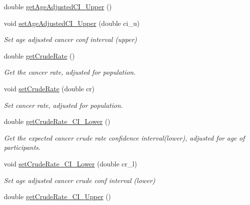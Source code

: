 \begin{DoxyCompactItemize}
double \mbox{\hyperlink{classbridges_1_1data__src__dependent_1_1_cancer_incidence_ae7b71d91c3acae9fce3536f6a9d8362b}{get\+Age\+Adjusted\+C\+I\+\_\+\+Upper}} ()
\item 
void \mbox{\hyperlink{classbridges_1_1data__src__dependent_1_1_cancer_incidence_aeb386486bfbd96ba9ab689b7d95d4522}{set\+Age\+Adjusted\+C\+I\+\_\+\+Upper}} (double ci\+\_\+u)
\begin{DoxyCompactList}\small\item\em Set age adjusted cancer conf interval (upper) \end{DoxyCompactList}\item 
double \mbox{\hyperlink{classbridges_1_1data__src__dependent_1_1_cancer_incidence_afc2ddb3099dffc46371ad7188278501d}{get\+Crude\+Rate}} ()
\begin{DoxyCompactList}\small\item\em Get the cancer rate, adjusted for population. \end{DoxyCompactList}\item 
void \mbox{\hyperlink{classbridges_1_1data__src__dependent_1_1_cancer_incidence_a64a737fd7481262650efd596c508ffd6}{set\+Crude\+Rate}} (double cr)
\begin{DoxyCompactList}\small\item\em Set cancer rate, adjusted for population. \end{DoxyCompactList}\item 
double \mbox{\hyperlink{classbridges_1_1data__src__dependent_1_1_cancer_incidence_a8c410730b03abc78395e75b5024d495e}{get\+Crude\+Rate\+\_\+\+C\+I\+\_\+\+Lower}} ()
\begin{DoxyCompactList}\small\item\em Get the expected cancer crude rate confidence interval(lower), adjusted for age of participants. \end{DoxyCompactList}\item 
void \mbox{\hyperlink{classbridges_1_1data__src__dependent_1_1_cancer_incidence_a72e3960af58f32d26e32f49ada2f1555}{set\+Crude\+Rate\+\_\+\+C\+I\+\_\+\+Lower}} (double cr\+\_\+l)
\begin{DoxyCompactList}\small\item\em Set age adjusted cancer crude conf interval (lower) \end{DoxyCompactList}\item 
double \mbox{\hyperlink{classbridges_1_1data__src__dependent_1_1_cancer_incidence_a4ca1ceed275ab6371f861d3a03975f15}{get\+Crude\+Rate\+\_\+\+C\+I\+\_\+\+Upper}} ()
\item 

\end{DoxyCompactItemize}
